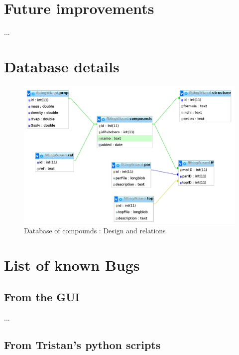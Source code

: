 \documentclass[12pt,a4paper]{article}
\begin{document}
\clearpage


\section{Future improvements}

...


\section{Database details}

\begin{figure}[h!]
\centering
\includegraphics[width=0.9\linewidth]{pics/db}
\caption{Database of compounds : Design and relations}
\label{dbFig}
\end{figure}


\section{List of known Bugs}

\subsection{From the GUI}

...

\subsection{From Tristan's python scripts}
\end{document}
